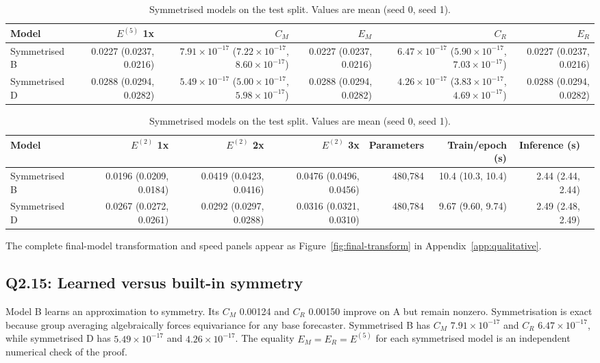 \documentclass{article}
\newcommand{\Efive}{\ensuremath{E^{(5)}}}
\newcommand{\Etwo}{\ensuremath{E^{(2)}}}
\newcommand{\CM}{\ensuremath{C_M}}
\newcommand{\CR}{\ensuremath{C_R}}
\newcommand{\EM}{\ensuremath{E_M}}
\newcommand{\ER}{\ensuremath{E_R}}
\begin{document}
\begin{table}[H]
\centering
\caption{Symmetrised models on the test split. Values are mean (seed 0, seed 1).}
\label{tab:symmetrised}
\scriptsize
\begin{adjustbox}{max width=\linewidth}
\begin{tabular}{lrrrrr}
\toprule
Model & \Efive{} 1x & \CM & \EM & \CR & \ER \\
\midrule
Symmetrised B & 0.0227 (0.0237, 0.0216) & $7.91{\times}10^{-17}$ ($7.22{\times}10^{-17}$, $8.60{\times}10^{-17}$) & 0.0227 (0.0237, 0.0216) & $6.47{\times}10^{-17}$ ($5.90{\times}10^{-17}$, $7.03{\times}10^{-17}$) & 0.0227 (0.0237, 0.0216) \\
Symmetrised D & 0.0288 (0.0294, 0.0282) & $5.49{\times}10^{-17}$ ($5.00{\times}10^{-17}$, $5.98{\times}10^{-17}$) & 0.0288 (0.0294, 0.0282) & $4.26{\times}10^{-17}$ ($3.83{\times}10^{-17}$, $4.69{\times}10^{-17}$) & 0.0288 (0.0294, 0.0282) \\
\bottomrule
\end{tabular}
\end{adjustbox}

\vspace{5pt}
\begin{adjustbox}{max width=\linewidth}
\begin{tabular}{lrrrrrrr}
\toprule
Model & \Etwo{} 1x & \Etwo{} 2x & \Etwo{} 3x & Parameters & Train/epoch (s) & Inference (s) \\
\midrule
Symmetrised B & 0.0196 (0.0209, 0.0184) & 0.0419 (0.0423, 0.0416) & 0.0476 (0.0496, 0.0456) & 480,784 & 10.4 (10.3, 10.4) & 2.44 (2.44, 2.44) \\
Symmetrised D & 0.0267 (0.0272, 0.0261) & 0.0292 (0.0297, 0.0288) & 0.0316 (0.0321, 0.0310) & 480,784 & 9.67 (9.60, 9.74) & 2.49 (2.48, 2.49) \\
\bottomrule
\end{tabular}
\end{adjustbox}
\end{table}

The complete final-model transformation and speed panels appear as Figure~\ref{fig:final-transform} in Appendix~\ref{app:qualitative}.

\subsection*{Q2.15: Learned versus built-in symmetry}

Model B learns an approximation to symmetry. Its \CM{} 0.00124 and \CR{} 0.00150 improve on A but remain nonzero. Symmetrisation is exact because group averaging algebraically forces equivariance for any base forecaster. Symmetrised B has \CM{} $7.91\times10^{-17}$ and \CR{} $6.47\times10^{-17}$, while symmetrised D has $5.49\times10^{-17}$ and $4.26\times10^{-17}$. The equality \EM{}$=\ER{}=\Efive{}$ for each symmetrised model is an independent numerical check of the proof.
\end{document}
